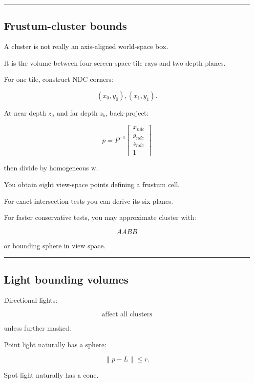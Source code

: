 \begin{center}\rule{0.5\linewidth}{0.5pt}\end{center}

\subsection{Frustum-cluster bounds}\label{04-visual-computing-ii-ch040-frustum-cluster-bounds}

A cluster is not really an axis-aligned world-space box.

It is the volume between four screen-space tile rays and two depth planes.

For one tile, construct NDC corners:

\[
(x_0,y_0),(x_1,y_1).
\]

At near depth \(z_a\) and far depth \(z_b\), back-project:

\[
p=
P^{-1}
\begin{bmatrix}
x_{ndc}\\
y_{ndc}\\
z_{ndc}\\
1
\end{bmatrix}
\]

then divide by homogeneous w.

You obtain eight view-space points defining a frustum cell.

For exact intersection tests you can derive its six planes.

For faster conservative tests, you may approximate cluster with:

\[
AABB
\]

or bounding sphere in view space.

\begin{center}\rule{0.5\linewidth}{0.5pt}\end{center}

\subsection{Light bounding volumes}\label{04-visual-computing-ii-ch040-light-bounding-volumes}

Directional lights:

\[
\boxed{\text{affect all clusters}}
\]

unless further masked.

Point light naturally has a sphere:

\[
\|p-L\|\le r.
\]

Spot light naturally has a cone.

